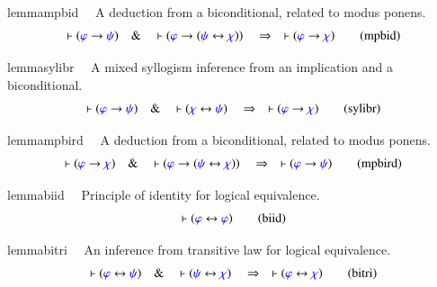 \begin{restatable}{lemma}{mpbid}~~ A deduction from a biconditional, related to
modus ponens.  
\begin{align}
\vdash ( \mw{\varphi} \rightarrow \mw{\psi} )\quad\&\quad \vdash ( \mw{\varphi}
    \rightarrow ( \mw{\psi} \leftrightarrow \mw{\chi} ) )\quad\Rightarrow\quad
    \vdash ( \mw{\varphi} \rightarrow \mw{\chi} )\label{eq:mpbid}\tag{mpbid}
\end{align}
\end{restatable}

\begin{restatable}{lemma}{sylibr}~~ A mixed syllogism inference from an
implication and a biconditional.
\begin{align}
\vdash ( \mw{\varphi} \rightarrow \mw{\psi} )\quad\&\quad \vdash ( \mw{\chi}
    \leftrightarrow \mw{\psi} )\quad\Rightarrow\quad \vdash ( \mw{\varphi}
    \rightarrow \mw{\chi} )\label{eq:sylibr}\tag{sylibr}
\end{align}
\end{restatable}

\begin{restatable}{lemma}{mpbird}~~ A deduction from a biconditional, related to
modus ponens.  
\begin{align}
\vdash ( \mw{\varphi} \rightarrow \mw{\chi} )\quad\&\quad \vdash ( \mw{\varphi}
    \rightarrow ( \mw{\psi} \leftrightarrow \mw{\chi} ) )\quad\Rightarrow\quad
    \vdash ( \mw{\varphi} \rightarrow \mw{\psi} )\label{eq:mpbird}\tag{mpbird}
\end{align}
\end{restatable}

\begin{restatable}{lemma}{biid}~~ Principle of identity for logical equivalence.
\begin{align}
\vdash ( \mw{\varphi} \leftrightarrow \mw{\varphi} )\label{eq:biid}\tag{biid}
\end{align}
\end{restatable}

\begin{restatable}{lemma}{bitri}~~ An inference from transitive law for logical
equivalence.  
\begin{align}
\vdash ( \mw{\varphi} \leftrightarrow \mw{\psi} )\quad\&\quad \vdash (
    \mw{\psi} \leftrightarrow \mw{\chi} )\quad\Rightarrow\quad \vdash (
    \mw{\varphi} \leftrightarrow \mw{\chi} )\label{eq:bitri}\tag{bitri}
\end{align}
\end{restatable}


